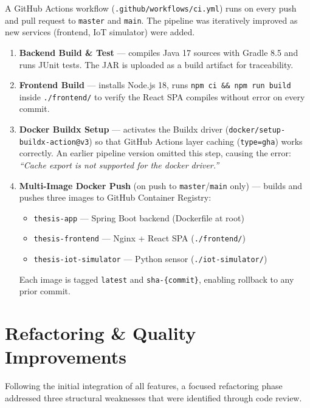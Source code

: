 \documentclass[12pt,a4paper,twoside]{article}
\begin{document}
A GitHub Actions workflow (\texttt{.github/workflows/ci.yml}) runs on
every push and pull request to \texttt{master} and \texttt{main}. The
pipeline was iteratively improved as new services (frontend, IoT simulator)
were added.

\begin{enumerate}[noitemsep]
  \item \textbf{Backend Build \& Test} --- compiles Java 17 sources with
        Gradle 8.5 and runs JUnit tests. The JAR is uploaded as a build
        artifact for traceability.
  \item \textbf{Frontend Build} --- installs Node.js 18, runs
        \texttt{npm ci \&\& npm run build} inside \texttt{./frontend/} to
        verify the React SPA compiles without error on every commit.
  \item \textbf{Docker Buildx Setup} --- activates the Buildx driver
        (\texttt{docker/setup-buildx-action@v3}) so that GitHub Actions
        layer caching (\texttt{type=gha}) works correctly. An earlier
        pipeline version omitted this step, causing the error:
        \emph{``Cache export is not supported for the docker driver.''}
  \item \textbf{Multi-Image Docker Push} (on push to \texttt{master}/\texttt{main}
        only) --- builds and pushes three images to GitHub Container Registry:
        \begin{itemize}[noitemsep]
          \item \texttt{thesis-app} --- Spring Boot backend (Dockerfile at root)
          \item \texttt{thesis-frontend} --- Nginx + React SPA (\texttt{./frontend/})
          \item \texttt{thesis-iot-simulator} --- Python sensor (\texttt{./iot-simulator/})
        \end{itemize}
        Each image is tagged \texttt{latest} and \texttt{sha-\{commit\}},
        enabling rollback to any prior commit.
\end{enumerate}

\section{Refactoring \& Quality Improvements}
\label{sec:refactor}

Following the initial integration of all features, a focused refactoring
phase addressed three structural weaknesses that were identified through code
review.
\end{document}
